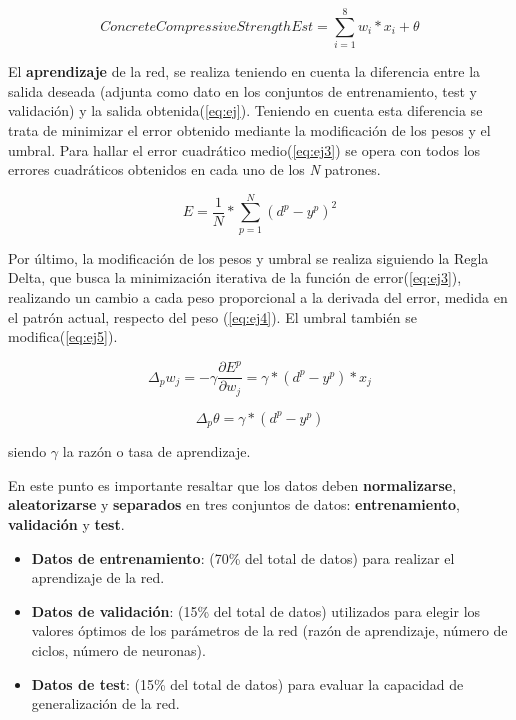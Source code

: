 \documentclass[11pt,spanish,listoffigures,listoftables]{workluis}
\begin{document}
\begin{equation}\label{eq:ej2}
ConcreteCompressiveStrengthEst = \sum_{i=1}^{8}w_{i}*x_{i} + \theta
\end{equation}

\par El \textbf{aprendizaje} de la red, se realiza teniendo en cuenta la diferencia entre la salida deseada (adjunta como dato en los conjuntos de entrenamiento, test y validación) y la salida obtenida(\ref{eq:ej}). Teniendo en cuenta esta diferencia se trata de minimizar el error obtenido mediante la modificación de los pesos y el umbral. Para hallar el error cuadrático medio(\ref{eq:ej3}) se opera con todos los errores cuadráticos obtenidos en cada uno de los \textit{N} patrones. 

\begin{equation}\label{eq:ej3}
E = \frac{1}{N}* \sum_{p=1}^{N}(d^{p} - y^{p})^{2}
\end{equation}

\par Por último, la modificación de los pesos y umbral se realiza siguiendo la Regla Delta, que busca la minimización iterativa de la función de error(\ref{eq:ej3}), realizando un cambio a cada peso proporcional a la derivada del error, medida en el patrón actual, respecto del peso (\ref{eq:ej4}). El umbral también se modifica(\ref{eq:ej5}).

\begin{equation}\label{eq:ej4}
\Delta_{p}w_{j} = -\gamma\frac{\partial E^{p}}{\partial w_{j}} = \gamma*(d^{p} - y^{p})*x_{j}
\end{equation} 

\begin{equation}\label{eq:ej5}
\Delta_{p}\theta = \gamma*(d^{p} - y^{p})
\end{equation}

\par siendo $\gamma$ la razón o tasa de aprendizaje.

\par En este punto es importante resaltar que los datos deben \textbf{normalizarse}, \textbf{aleatorizarse} y \textbf{separados} en tres conjuntos de datos: \textbf{entrenamiento}, \textbf{validación} y \textbf{test}.

\begin{itemize}
\item \textbf{Datos de entrenamiento}: (70\%  del  total  de  datos) para  realizar  el aprendizaje de la red. 
\item \textbf{Datos de validación}: (15\%  del  total  de  datos) utilizados para elegir los  valores  óptimos  de los parámetros  de  la  red  (razón  de aprendizaje, número de ciclos, número de neuronas).
\item \textbf{Datos de test}: (15\%  del  total  de  datos) para evaluar la capacidad de generalización de la red.
\end{itemize}
\end{document}
